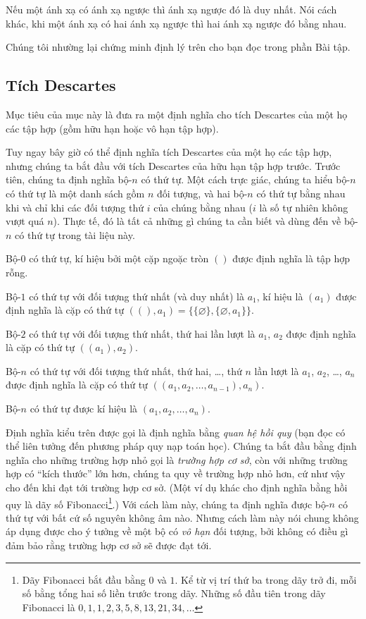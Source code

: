 \begin{theorem}
    Nếu một ánh xạ có ánh xạ ngược thì ánh xạ ngược đó là duy nhất. Nói cách khác, khi một ánh xạ có hai ánh xạ ngược thì hai ánh xạ ngược đó bằng nhau.
\end{theorem}

Chúng tôi nhường lại chứng minh định lý trên cho bạn đọc trong phần Bài tập.

\subsection{Tích Descartes}

Mục tiêu của mục này là đưa ra một định nghĩa cho tích Descartes của một họ các tập hợp (gồm hữu hạn hoặc vô hạn tập hợp).

Tuy ngay bây giờ có thể định nghĩa tích Descartes của một họ các tập hợp, nhưng chúng ta bắt đầu với tích Descartes của hữu hạn tập hợp trước. Trước tiên, chúng ta định nghĩa bộ-$n$ có thứ tự. Một cách trực giác, chúng ta hiểu bộ-$n$ có thứ tự là một danh sách gồm $n$ đối tượng, và hai bộ-$n$ có thứ tự bằng nhau khi và chỉ khi các đối tượng thứ $i$ của chúng bằng nhau ($i$ là số tự nhiên không vượt quá $n$). Thực tế, đó là tất cả những gì chúng ta cần biết và dùng đến về bộ-$n$ có thứ tự trong tài liệu này.

\begin{definition}[Bộ-$n$ có thứ tự]
    Bộ-$0$ có thứ tự, kí hiệu bởi một cặp ngoặc tròn $()$ được định nghĩa là tập hợp rỗng.

    Bộ-$1$ có thứ tự với đối tượng thứ nhất (và duy nhất) là $a_{1}$, kí hiệu là $(a_{1})$ được định nghĩa là cặp có thứ tự $((), a_{1}) = \{ \{ \varnothing \}, \{ \varnothing, a_{1} \} \}$.

    Bộ-$2$ có thứ tự với đối tượng thứ nhất, thứ hai lần lượt là $a_{1}$, $a_{2}$ được định nghĩa là cặp có thứ tự $((a_{1}), a_{2})$.

    Bộ-$n$ có thứ tự với đối tượng thứ nhất, thứ hai, \ldots, thứ $n$ lần lượt là $a_{1}$, $a_{2}$, \ldots, $a_{n}$ được định nghĩa là cặp có thứ tự $((a_{1}, a_{2}, \ldots, a_{n-1}), a_{n})$.

    Bộ-$n$ có thứ tự được kí hiệu là $(a_{1}, a_{2}, \ldots, a_{n})$.
\end{definition}

Định nghĩa kiểu trên được gọi là định nghĩa bằng \textit{quan hệ hồi quy} (bạn đọc có thể liên tưởng đến phương pháp quy nạp toán học). Chúng ta bắt đầu bằng định nghĩa cho những trường hợp nhỏ gọi là \textit{trường hợp cơ sở}, còn với những trường hợp có ``kích thước'' lớn hơn, chúng ta quy về trường hợp nhỏ hơn, cứ như vậy cho đến khi đạt tới trường hợp cơ sở. (Một ví dụ khác cho định nghĩa bằng hồi quy là dãy số Fibonacci\footnote{Dãy Fibonacci bắt đầu bằng $0$ và $1$. Kể từ vị trí thứ ba trong dãy trở đi, mỗi số bằng tổng hai số liền trước trong dãy. Những số đầu tiên trong dãy Fibonacci là $0, 1, 1, 2, 3, 5, 8, 13, 21, 34,\ldots$}.) Với cách làm này, chúng ta định nghĩa được bộ-$n$ có thứ tự với bất cứ số nguyên không âm nào. Nhưng cách làm này nói chung không áp dụng được cho ý tưởng về một bộ có \textit{vô hạn} đối tượng, bởi không có điều gì đảm bảo rằng trường hợp cơ sở sẽ được đạt tới.


